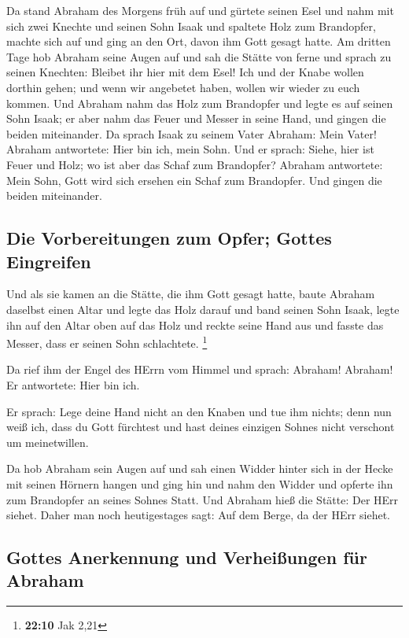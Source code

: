  Da stand Abraham des Morgens früh auf und gürtete seinen
Esel und nahm mit sich zwei Knechte und seinen Sohn Isaak und spaltete
Holz zum Brandopfer, machte sich auf und ging an den Ort, davon ihm Gott
gesagt hatte.  Am dritten Tage hob Abraham seine Augen auf
und sah die Stätte von ferne  und sprach zu seinen
Knechten: Bleibet ihr hier mit dem Esel! Ich und der Knabe wollen
dorthin gehen; und wenn wir angebetet haben, wollen wir wieder zu euch
kommen.  Und Abraham nahm das Holz zum Brandopfer und
legte es auf seinen Sohn Isaak; er aber nahm das Feuer und Messer in
seine Hand, und gingen die beiden miteinander.  Da sprach
Isaak zu seinem Vater Abraham: Mein Vater! Abraham antwortete: Hier bin
ich, mein Sohn. Und er sprach: Siehe, hier ist Feuer und Holz; wo ist
aber das Schaf zum Brandopfer?  Abraham antwortete: Mein
Sohn, Gott wird sich ersehen ein Schaf zum Brandopfer. Und gingen die
beiden miteinander.

\hypertarget{die-vorbereitungen-zum-opfer-gottes-eingreifen}{%
\subsection{Die Vorbereitungen zum Opfer; Gottes
Eingreifen}\label{die-vorbereitungen-zum-opfer-gottes-eingreifen}}

 Und als sie kamen an die Stätte, die ihm Gott gesagt
hatte, baute Abraham daselbst einen Altar und legte das Holz darauf und
band seinen Sohn Isaak, legte ihn auf den Altar oben auf das Holz
 und reckte seine Hand aus und fasste das Messer, dass er
seinen Sohn schlachtete. \footnote{\textbf{22:10} Jak 2,21}

 Da rief ihm der Engel des HErrn vom Himmel und sprach:
Abraham! Abraham! Er antwortete: Hier bin ich.

 Er sprach: Lege deine Hand nicht an den Knaben und tue
ihm nichts; denn nun weiß ich, dass du Gott fürchtest und hast deines
einzigen Sohnes nicht verschont um meinetwillen.

 Da hob Abraham sein Augen auf und sah einen Widder
hinter sich in der Hecke mit seinen Hörnern hangen und ging hin und nahm
den Widder und opferte ihn zum Brandopfer an seines Sohnes Statt.
 Und Abraham hieß die Stätte: Der HErr siehet. Daher man
noch heutigestages sagt: Auf dem Berge, da der HErr siehet.

\hypertarget{gottes-anerkennung-und-verheiuxdfungen-fuxfcr-abraham}{%
\subsection{Gottes Anerkennung und Verheißungen für
Abraham}\label{gottes-anerkennung-und-verheiuxdfungen-fuxfcr-abraham}}

